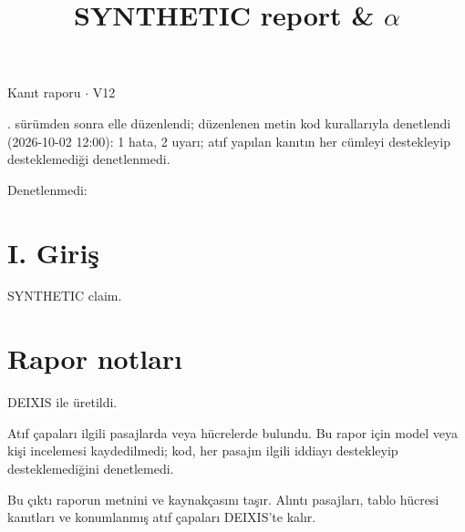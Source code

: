\documentclass[journal]{IEEEtran}
\begin{document}
\renewcommand{\abstractname}{Özet}
\renewcommand{\IEEEkeywordsname}{Dizin Terimleri}
\renewcommand{\refname}{Kaynaklar}

\title{SYNTHETIC report \& \ensuremath{\alpha}}

\maketitle

\noindent Kanıt raporu \ensuremath{\cdot} V12

. sürümden sonra elle düzenlendi; düzenlenen metin kod kurallarıyla denetlendi (2026-10-02 12:00): 1 hata, 2 uyarı; atıf yapılan kanıtın her cümleyi destekleyip desteklemediği denetlenmedi.

\noindent Denetlenmedi:

\section*{I. Giriş}

SYNTHETIC claim. \cite{Synth26}

\section*{Rapor notları}

DEIXIS ile üretildi.

Atıf çapaları ilgili pasajlarda veya hücrelerde bulundu. Bu rapor için model veya kişi incelemesi kaydedilmedi; kod, her pasajın ilgili iddiayı destekleyip desteklemediğini denetlemedi.

Bu çıktı raporun metnini ve kaynakçasını taşır. Alıntı pasajları, tablo hücresi kanıtları ve konumlanmış atıf çapaları DEIXIS'te kalır.




\end{document}
